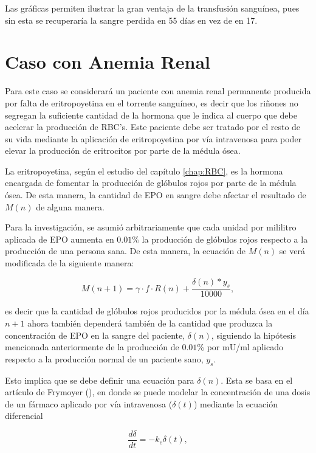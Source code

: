 Las gráficas permiten ilustrar la gran ventaja de la transfusión sanguínea, pues sin esta se recuperaría la sangre perdida en 55 días en vez de en 17.

\section{Caso con Anemia Renal}\label{Sec:variaciones:anemia}

Para este caso se considerará un paciente con anemia renal permanente producida por falta de eritropoyetina en el torrente sanguíneo, es decir que los riñones no segregan la suficiente cantidad de la hormona que le indica al cuerpo que debe acelerar la producción de RBC's. Este paciente debe ser tratado por el resto de su vida mediante la aplicación de eritropoyetina por vía intravenosa para poder elevar la producción de eritrocitos por parte de la médula ósea. 

La eritropoyetina, según el estudio del capítulo \ref{chap:RBC}, es la hormona encargada de fomentar la producción de glóbulos rojos por parte de la médula ósea. De esta manera, la cantidad de EPO en sangre debe afectar el resultado de $M(n)$ de alguna manera.

Para la investigación, se asumió arbitrariamente que cada unidad por mililitro aplicada de EPO aumenta en $0.01\%$ la producción de glóbulos rojos respecto a la producción de una persona sana. De esta manera, la ecuación de $M(n)$ se verá modificada de la siguiente manera: 

\begin{equation*}
    M(n+1)=\gamma\cdot f \cdot R(n)+\frac{\delta(n)*y_s}{10000},
\end{equation*}

es decir que la cantidad de glóbulos rojos producidos por la médula ósea en el día $n+1$ ahora también dependerá también de la cantidad que produzca la concentración de EPO en la sangre del paciente, $\delta(n)$, siguiendo la hipótesis mencionada anteriormente de la producción de $0.01\%$ por mU/ml aplicado respecto a la producción normal de un paciente sano, $y_s$. 

Esto implica que se debe definir una ecuación para $\delta(n)$. Esta se basa en el artículo de Frymoyer (\cite{FRYMOYER2019123}), en donde se puede modelar la concentración de una dosis de un fármaco aplicado por vía intravenosa ($\delta(t)$) mediante la ecuación diferencial

\begin{equation}\label{eq:diferencial}
    \dfrac{d\delta}{dt}=-k_e \delta(t),
\end{equation}

